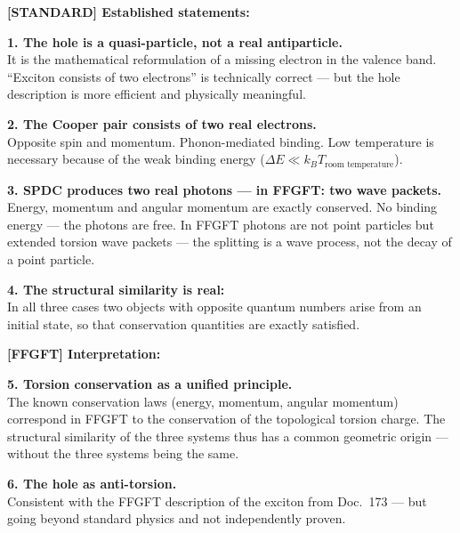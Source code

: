 \begin{conclusionBox}

\textbf{[STANDARD] Established statements:}

\textbf{1. The hole is a quasi-particle, not a real antiparticle.}\\
It is the mathematical reformulation of a missing electron
in the valence band. ``Exciton consists of two electrons'' is
technically correct --- but the hole description is more efficient
and physically meaningful.

\textbf{2. The Cooper pair consists of two real electrons.}\\
Opposite spin and momentum. Phonon-mediated binding.
Low temperature is necessary because of the weak binding energy
($\Delta E \ll k_BT_\text{room temperature}$).

\textbf{3. SPDC produces two real photons --- in FFGFT: two wave packets.}\\
Energy, momentum and angular momentum are exactly conserved.
No binding energy --- the photons are free.
In FFGFT photons are not point particles but
extended torsion wave packets --- the splitting
is a wave process, not the decay of a point particle.

\textbf{4. The structural similarity is real:}\\
In all three cases two objects with
opposite quantum numbers arise from an initial state,
so that conservation quantities are exactly satisfied.

\medskip

\textbf{[FFGFT] Interpretation:}

\textbf{5. Torsion conservation as a unified principle.}\\
The known conservation laws (energy, momentum, angular momentum)
correspond in FFGFT to the conservation of the topological
torsion charge. The structural similarity of the three systems
thus has a common geometric origin ---
without the three systems being the same.

\textbf{6. The hole as anti-torsion.}\\
Consistent with the FFGFT description of the exciton
from Doc.~173 --- but going beyond standard physics
and not independently proven.
\end{conclusionBox}


